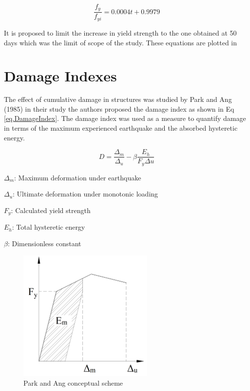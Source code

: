 \begin{equation}
  \frac{f_y}{f_{yi}}=0.0004t+0.9979
  \label{eq.fourteen}
\end{equation} 

It is proposed to limit the increase in yield strength to the one obtained at 50 days which was the limit of scope of the study. These equations are plotted in 

\section{Damage Indexes}
The effect of cumulative damage in structures was studied by Park and Ang (1985) \cite{Young-JiPark1985} in their study the authors proposed the damage index as shown in Eq \ref{eq.DamageIndex}. The damage index was used as a measure to quantify damage in terms of the maximum experienced earthquake and the absorbed hysteretic energy.

\begin{equation}
  D=\frac{\Delta_{m}}{\Delta_{u}}-\beta \frac{E_h}{F_{y}\Delta{u}}
  \label{eq.DamageIndex}
\end{equation} 

$\Delta_{m}$: Maximum deformation under earthquake

$\Delta_{u}$: Ultimate deformation under monotonic loading

$F_{y}$: Calculated yield strength

$E_{h}$: Total hysteretic energy

$\beta$: Dimensionless constant 

\begin{figure}[htbp]
\centering
\includegraphics[width=0.6\textwidth]{Chapter-2/figs/Park_and_Ang_Model}
\caption{Park and Ang conceptual scheme}
\label{fig:Paa}
\end{figure}

